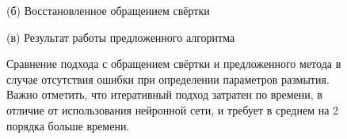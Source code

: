 \begin{figure}[H]
\begin{minipage}[t]{0.3\linewidth}
(б) Восстановленное обращением свёртки\\ 
\end{minipage}
\hfill
\begin{minipage}[t]{0.3\linewidth}
(в) Результат работы предложенного алгоритма\\ 
\end{minipage}
\caption{ Сравнение подхода с обращением свёртки и предложенного метода в случае отсутствия ошибки при определении параметров размытия. Важно отметить, что итеративный подход затратен по времени, в отличие от использования нейронной сети, и требует в среднем на 2 порядка больше времени.}
\label{ris:restore_comparison}
\end{figure}


